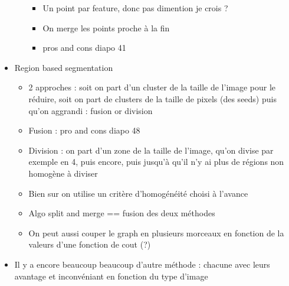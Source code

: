 \documentclass{article}
\theoremstyle{plain}%
\theoremstyle{definition}
\theoremstyle{remark}
\begin{document}
\begin{itemize}
\begin{itemize}
\begin{itemize}
            \item Un point par feature, donc pas dimention je crois ? 
            \item On merge les points proche à la fin
            \item pros and cons diapo 41
        \end{itemize}
    \end{itemize}
    \item Region based segmentation
    \begin{itemize}
        \item 2 approches : soit on part d'un cluster de la taille de l'image pour le réduire, soit on part de clusters de la taille de pixels (des seeds) puis qu'on aggrandi : fusion or division
        \item Fusion : pro and cons diapo 48
        \item Division : on part d'un zone de la taille de l'image, qu'on divise par exemple en 4, puis encore, puis jusqu'à qu'il n'y ai plus de régions non homogène à diviser
        \item Bien sur on utilise un critère d'homogénéité choisi à l'avance 
        \item Algo split and merge == fusion des deux méthodes
        \item On peut aussi couper le graph en plusieurs morceaux en fonction de la valeurs d'une fonction de cout (?)
    \end{itemize}
    \item Il y a encore beaucoup beaucoup d'autre méthode : chacune avec leurs avantage et inconvéniant en fonction du type d'image 
\end{itemize}
\end{document}
